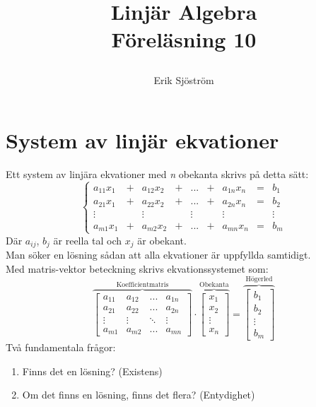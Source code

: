 

\title{
	 Linjär Algebra\\
	 Föreläsning 10
    \author{Erik Sjöström}
}

\maketitle
\section{System av linjär ekvationer} %
\label{sec:system_av_linj_r_ekvationer}
Ett system av linjära ekvationer med \textit{n} obekanta skrivs på detta sätt:
\[
\left\{ \begin{array}{ccccccccc}
	a_{11}x_1 &+& a_{12}x_2 &+ &...& +& a_{1n}x_n &=& b_1\\
	a_{21}x_1 &+& a_{22}x_2 &+ &...& +& a_{2n}x_n &=& b_2\\
	\vdots && \vdots && \vdots && \vdots && \vdots       \\
	a_{m1}x_1 &+& a_{m2}x_2 &+&...&+& a_{mn}x_n &=& b_m 
\end{array}
\]
Där $a_{ij}$, $b_j$ är reella tal och $x_j$ är obekant.\\
Man söker en lösning sådan att alla ekvationer är uppfyllda samtidigt.\\
Med matris-vektor beteckning skrivs ekvationssystemet som:
\[
\overbrace{
\begin{bmatrix}
a_{11}&a_{12}&...&a_{1n}\\
a_{21}&a_{22}&...&a_{2n}\\
\vdots & \vdots &\ddots& \vdots\\
a_{m1}&a_{m2}&...&a_{mn} \end{bmatrix}}^\text{Koefficientmatris} \cdot \overbrace{\begin{bmatrix} x_1\\x_2\\\vdots\\x_n \end{bmatrix}}^\text{Obekanta} = \overbrace{\begin{bmatrix} b_1\\b_2\\\vdots\\b_m \end{bmatrix}}^\text{Högerled}
\] 
Två fundamentala frågor:
\begin{enumerate}
	\item Finns det en lösning? (Existens)
	\item Om det finns en lösning, finns det flera? (Entydighet)
\end{enumerate}

